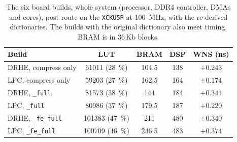 \begin{table}[H]
\centering
\caption[The six board builds]{The six board builds, whole system (processor,
DDR4 controller, DMAs and cores), post-route on the \texttt{XCKU5P} at
\SI{100}{\mega\hertz}, with the re-derived dictionaries. The builds with the
original dictionary also meet timing. BRAM is in 36\,Kb blocks.}
\label{tab:builds}
\small
\begin{tabular}{l|c|c|c|c}
\textbf{Build} & \textbf{LUT} & \textbf{BRAM} & \textbf{DSP} & \textbf{WNS (ns)}\\
\hline
DRHE, compress only    & \num{61011} (\SI{28}{\percent}) & 104.5 & 138 & $+0.243$\\
LPC, compress only     & \num{59203} (\SI{27}{\percent}) & 162.5 & 164 & $+0.174$\\
DRHE, \texttt{\_full}  & \num{81573} (\SI{38}{\percent}) & 144   & 184 & $+0.341$\\
LPC, \texttt{\_full}   & \num{80986} (\SI{37}{\percent}) & 179.5 & 187 & $+0.220$\\
DRHE, \texttt{\_fe\_full} & \num{101383} (\SI{47}{\percent}) & 211 & 480 & $+0.340$\\
LPC, \texttt{\_fe\_full}  & \num{100709} (\SI{46}{\percent}) & 246.5 & 483 & $+0.374$\\
\end{tabular}
\end{table}

